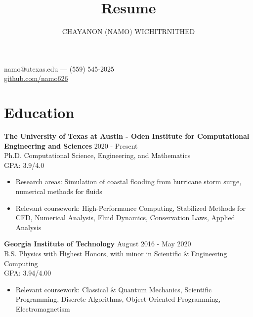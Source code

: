\documentclass[10pt]{article}
\makeatletter
\renewcommand{\maketitle}{
  \begin{center}
    {\Large\bfseries\theauthor}

    namo@utexas.edu --- (559) 545-2025 \\
    \url{github.com/namo626}
  \end{center}
}
\newenvironment{body}{}
\makeatother
\begin{document}
\title{Resume}
\author{CHAYANON (NAMO) WICHITRNITHED}
\maketitle

\section{Education}
\begin{body}
  \textbf{The University of Texas at Austin - Oden Institute for Computational Engineering and Sciences} \hfill 2020 - Present \\
   Ph.D. Computational Science, Engineering, and Mathematics \\
    GPA: 3.9/4.0
  \begin{itemize}[leftmargin=*,topsep=0pt]
    \setlength\itemsep{-0.3em}
    \item Research areas: Simulation of coastal flooding from hurricane storm surge, numerical methods for fluids
    \item Relevant coursework: High-Performance Computing, Stabilized Methods for CFD, Numerical Analysis, Fluid Dynamics, Conservation Laws, Applied Analysis
  \end{itemize}
  \medskip
\noindent
  \textbf{Georgia Institute of Technology} \hfill August 2016 - May 2020 \\
  B.S. Physics with Highest Honors, with minor in Scientific \& Engineering Computing \\
  GPA: 3.94/4.00
  \begin{itemize}[leftmargin=*,topsep=0pt]
    \setlength\itemsep{-0.3em}
  \item Relevant coursework: Classical \& Quantum Mechanics, Scientific Programming, Discrete Algorithms, Object-Oriented Programming, Electromagnetism
  \end{itemize}
\end{body}
\end{document}
